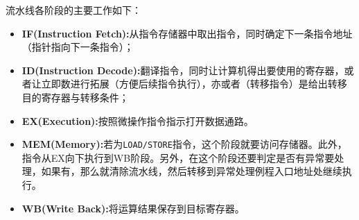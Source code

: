 \documentclass[lang=cn,a4paper,newtx]{elegantpaper}
\begin{document}
流水线各阶段的主要工作如下：
\begin{itemize}
  \item \textbf{IF(Instruction Fetch):}从指令存储器中取出指令，同时确定下一条指令地址（指针指向下一条指令）；
  \item \textbf{ID(Instruction Decode):}翻译指令，同时让计算机得出要使用的寄存器，或者让立即数进行拓展（方便后续指令执行），亦或者（转移指令）是给出转移目的寄存器与转移条件；
  \item \textbf{EX(Execution):}按照微操作指令指示打开数据通路。
  \item \textbf{MEM(Memory):}若为\texttt{LOAD/STORE}指令，这个阶段就要访问存储器。此外，指令从EX向下执行到WB阶段。另外，在这个阶段还要判定是否有异常要处理，如果有，那么就清除流水线，然后转移到异常处理例程入口地址处继续执行。
  \item \textbf{WB(Write Back):}将运算结果保存到目标寄存器。
\end{itemize}
\end{document}
